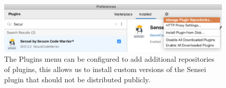 \begin{figure}
  \centering
  \includegraphics[width=\textwidth,page=1]{04-tools/figures/figures2.pdf}
  \caption[Adding plugin repositories to the Plugins menu]{The Plugins menu can be configured to add additional repositories of plugins, this allows us to install custom versions of the Sensei plugin that should not be distributed publicly.}
  \label{fig:pluginrepos} 
\end{figure}
